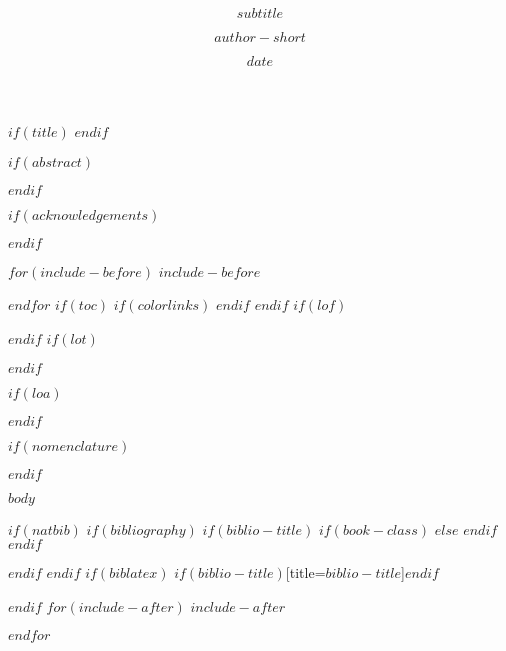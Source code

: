 \documentclass[$if(fontsize)$$fontsize$,$endif$$if(lang)$$lang$,$endif$$if(papersize)$$papersize$paper,$endif$$for(classoption)$$classoption$$sep$,$endfor$]{$documentclass$}
\title{\bfseries\AorE{$titel$\\[1ex]\normalfont\small\itshape(``$title$'')}{$title$}}
\subtitle{$subtitle$}
\author{$author-short$}{$author$}
\date{$date$}
\newcommand*{\WaterMark}[2][0.15\paperwidth]{%
  \AddToShipoutPicture*{\AtTextCenter{%
    \parbox[t]{0pt}{\makebox[0pt][c]{%
      \texttt{[image: \#2]}}}}}}
\begin{document}
 \frontmatter
  \WaterMark{./images/logo.png}
 $if(title)$
 \TitlePage
 $endif$

\DeclarationPage

$if(abstract)$

\clearpage
$endif$

$if(acknowledgements)$

\clearpage
$endif$

$for(include-before)$
$include-before$

$endfor$
$if(toc)$
{
$if(colorlinks)$
\hypersetup{linkcolor=$if(toccolor)$$toccolor$$else$black$endif$}
$endif$
\setcounter{tocdepth}{$toc-depth$}
\tableofcontents
\clearpage
}
$endif$
$if(lof)$
\setcounter{lofdepth}{2}
\listoffigures
\clearpage
$endif$
$if(lot)$
\listoftables
\clearpage
$endif$

$if(loa)$

$endif$

$if(nomenclature)$

$endif$

\mainmatter
$body$

\backmatter
$if(natbib)$
$if(bibliography)$
$if(biblio-title)$
$if(book-class)$
\renewcommand\bibname{$biblio-title$}
$else$
\renewcommand\refname{$biblio-title$}
$endif$
$endif$


$endif$
$endif$
$if(biblatex)$
\printbibliography$if(biblio-title)$[title=$biblio-title$]$endif$

$endif$
$for(include-after)$
$include-after$

$endfor$
\end{document}

